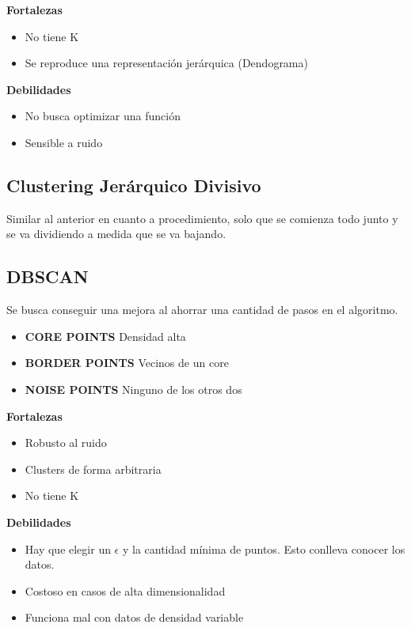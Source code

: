 \documentclass[titlepage,a4paper]{article}
\begin{document}
\textbf{Fortalezas}
\begin{itemize}
    \item No tiene K
    \item Se reproduce una representación jerárquica (Dendograma)
\end{itemize}

\textbf{Debilidades}
\begin{itemize}
    \item No busca optimizar una función
    \item Sensible a ruido
\end{itemize}

\subsection{Clustering Jerárquico Divisivo}
Similar al anterior en cuanto a procedimiento, solo que se comienza todo junto y se va dividiendo a medida que se va bajando.

\subsection{DBSCAN}
Se busca conseguir una mejora al ahorrar una cantidad de pasos en el algoritmo.

\begin{itemize}
    \item \textbf{CORE POINTS} Densidad alta
    \item \textbf{BORDER POINTS} Vecinos de un core
    \item \textbf{NOISE POINTS} Ninguno de los otros dos
\end{itemize}

\textbf{Fortalezas}
\begin{itemize}
    \item Robusto al ruido
    \item Clusters de forma arbitraria
    \item No tiene K
\end{itemize}

\textbf{Debilidades}
\begin{itemize}
    \item Hay que elegir un $\epsilon$ y la cantidad mínima de puntos. Esto conlleva conocer los datos.
    \item Costoso en casos de alta dimensionalidad
    \item Funciona mal con datos de densidad variable
\end{itemize}
\end{document}

